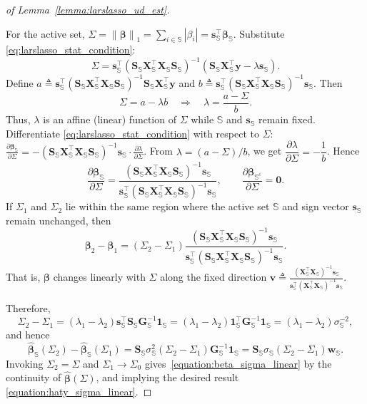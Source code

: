 \documentclass[10pt,a4paper]{amsart}
\newcommand\abs[1]{\left\lvert#1\right\rvert}
\newcommand{\bG}{{\bm{G}}}
\newcommand{\bS}{{\bm{S}}}
\newcommand{\bX}{{\bm{X}}}
\newcommand{\bbeta}{{\boldsymbol\beta}}
\newcommand{\bone}{{\bm{1}}}
\newcommand{\bs}{{\bm{s}}}
\newcommand{\bv}{{\bm{v}}}
\newcommand{\bw}{{\bm{w}}}
\newcommand{\by}{{\bm{y}}}
\newcommand{\bzero}{\boldsymbol{0}}
\newcommand\comple[1]{#1^c}
\newcommand{\mdframecolor}{gray!10}
\newcommand{\mdframehideline}{true}
\newcommand\normone[1]{\left\lVert#1\right\rVert_1}
\def\sS{{\mathbb{S}}}
\newcommand{\widehatbbeta}{{\widehat\bbeta}}
\begin{document}
\begin{proof}[of Lemma~\ref{lemma:larslasso_ud_est}]
\begin{mdframed}[hidealllines=\mdframehideline,backgroundcolor=\mdframecolor,frametitle={Relationship between $\widehatbbeta_\sS(\Sigma_2) - \widehatbbeta_\sS(\Sigma_1) $ and $ \Sigma_2 - \Sigma_1$:}]
For the active set, $\Sigma = \normone{\bbeta} = \sum_{i \in \sS} \abs{\beta_i} = \bs_\sS^\top \bbeta_\sS$.
Substitute \eqref{eq:larslasso_stat_condition}:
$$
\Sigma = \bs_\sS^\top (\bS_\sS\bX_\sS^\top \bX_\sS\bS_\sS)^{-1}(\bS_\sS\bX_\sS^\top \by - \lambda \bs_\sS).
$$
Define
$a \triangleq \bs_\sS^\top (\bS_\sS\bX_\sS^\top \bX_\sS\bS_\sS)^{-1} \bS_\sS\bX_\sS^\top \by$ 
and  $b \triangleq \bs_\sS^\top (\bS_\sS\bX_\sS^\top \bX_\sS\bS_\sS)^{-1} \bs_\sS$.
Then
$$
\Sigma = a - \lambda b
\quad \Longrightarrow \quad
\lambda = \frac{a - \Sigma}{b}.
$$
Thus, $\lambda$ is an affine (linear) function of $\Sigma$
while $\sS$ and $\bs_\sS$ remain fixed.
Differentiate \eqref{eq:larslasso_stat_condition} with respect to $\Sigma$:
$
\frac{\partial \bbeta_\sS}{\partial \Sigma}
= - (\bS_\sS\bX_\sS^\top \bX_\sS\bS_\sS)^{-1} \bs_\sS \cdot \frac{\partial \lambda}{\partial \Sigma}
$.
From $\lambda = (a - \Sigma)/b$, we get $\dfrac{\partial \lambda}{\partial \Sigma} = -\dfrac{1}{b}$.
Hence
$$
\frac{\partial\bbeta_\sS}{\partial \Sigma}
= \frac{(\bS_\sS\bX_\sS^\top \bX_\sS\bS_\sS)^{-1} \bs_\sS}
{\bs_\sS^\top (\bS_\sS\bX_\sS^\top \bX_\sS\bS_\sS)^{-1} \bs_\sS}
, \qquad
\frac{\partial\bbeta_{\comple{\sS}}}{\partial\Sigma} = \bzero.
$$
If $\Sigma_1$ and $\Sigma_2$ lie within the same region
where the active set $\sS$ and sign vector $\bs_\sS$ remain unchanged, then
\begin{equation}
\bbeta_2 - \bbeta_1
= (\Sigma_2 - \Sigma_1)
\frac{(\bS_\sS\bX_\sS^\top \bX_\sS\bS_\sS)^{-1} \bs_\sS}
{\bs_\sS^\top (\bS_\sS\bX_\sS^\top \bX_\sS\bS_\sS)^{-1} \bs_\sS}.
\end{equation}
That is, $\bbeta$ changes linearly with $\Sigma$
along the fixed direction
$
\bv \triangleq \frac{(\bX_\sS^\top \bX_\sS)^{-1} \bs_\sS}
{\bs_\sS^\top (\bX_\sS^\top \bX_\sS)^{-1} \bs_\sS}
$.
\end{mdframed}
Therefore,
$$
\Sigma_2 - \Sigma_1 = (\lambda_1 - \lambda_2) \bs_\sS^\top \bS_\sS \bG_\sS^{-1} \bone_\sS = (\lambda_1 - \lambda_2) \bone_\sS^\top \bG_\sS^{-1} \bone_\sS = (\lambda_1 - \lambda_2) \sigma_\sS^{-2},
$$
and hence
\begin{equation}\label{eq:beta_diff_final}
\widehatbbeta_\sS(\Sigma_2) - \widehatbbeta_\sS(\Sigma_1) 
= \bS_\sS \sigma_\sS^2 (\Sigma_2 - \Sigma_1) \bG_\sS^{-1} \bone_\sS 
= \bS_\sS \sigma_\sS (\Sigma_2 - \Sigma_1) \bw_\sS.
\end{equation}
Invoking $\Sigma_2 = \Sigma$ and $\Sigma_1 \to \Sigma_0$ gives~\eqref{equation:beta_sigma_linear} by the continuity of $\widehatbbeta(\Sigma)$, and implying the desired result \eqref{equation:haty_sigma_linear}. 
\end{proof}
\end{document}
